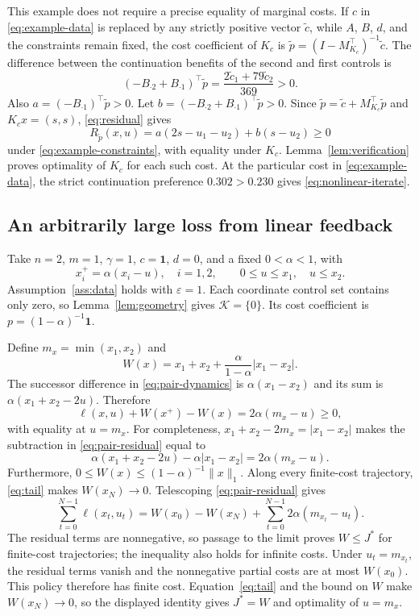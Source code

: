 \documentclass[10pt]{article}
\newcommand{\one}{\mathbf 1}
\begin{document}
This example does not require a precise equality of marginal costs. If $c$ in \eqref{eq:example-data} is replaced by any strictly positive vector $\widetilde c$, while $A$, $B$, $d$, and the constraints remain fixed, the cost coefficient of $K_c$ is $\widetilde p=(I-M_{K_c}^\top)^{-1}\widetilde c$. The difference between the continuation benefits of the second and first controls is
\[
 (-B_{\cdot2}+B_{\cdot1})^\top\widetilde p
 =\frac{2\widetilde c_1+79\widetilde c_2}{369}>0.
\]
Also $a=(-B_{\cdot1})^\top\widetilde p>0$. Let $b=(-B_{\cdot2}+B_{\cdot1})^\top\widetilde p>0$. Since $\widetilde p=\widetilde c+M_{K_c}^\top\widetilde p$ and $K_cx=(s,s)$, \eqref{eq:residual} gives
\[
 R_{\widetilde p}(x,u)=a(2s-u_1-u_2)+b(s-u_2)\ge0
\]
under \eqref{eq:example-constraints}, with equality under $K_c$. Lemma~\ref{lem:verification} proves optimality of $K_c$ for each such cost. At the particular cost in \eqref{eq:example-data}, the strict continuation preference $0.302>0.230$ gives \eqref{eq:nonlinear-iterate}.

\subsection{An arbitrarily large loss from linear feedback}

Take $n=2$, $m=1$, $\gamma=1$, $c=\one$, $d=0$, and a fixed $0<\alpha<1$, with
\begin{equation}
 x_i^+=\alpha(x_i-u),\quad i=1,2,\qquad
 0\le u\le x_1,\quad u\le x_2.
 \label{eq:pair-dynamics}
\end{equation}
Assumption~\ref{ass:data} holds with $\varepsilon=1$. Each coordinate control set contains only zero, so Lemma~\ref{lem:geometry} gives $\mathcal K=\{0\}$. Its cost coefficient is $p=(1-\alpha)^{-1}\one$.

Define $m_x=\min(x_1,x_2)$ and
\begin{equation}
 W(x)=x_1+x_2+\frac{\alpha}{1-\alpha}|x_1-x_2|.
 \label{eq:pair-value}
\end{equation}
The successor difference in \eqref{eq:pair-dynamics} is $\alpha(x_1-x_2)$ and its sum is $\alpha(x_1+x_2-2u)$. Therefore
\begin{equation}
 \ell(x,u)+W(x^+)-W(x)=2\alpha(m_x-u)\ge0,
 \label{eq:pair-residual}
\end{equation}
with equality at $u=m_x$. For completeness, $x_1+x_2-2m_x=|x_1-x_2|$ makes the subtraction in \eqref{eq:pair-residual} equal to
\[
 \alpha(x_1+x_2-2u)-\alpha|x_1-x_2|=2\alpha(m_x-u).
\]
Furthermore, $0\le W(x)\le(1-\alpha)^{-1}\|x\|_1$. Along every finite-cost trajectory, \eqref{eq:tail} makes $W(x_N)\to0$. Telescoping \eqref{eq:pair-residual} gives
\[
 \sum_{t=0}^{N-1}\ell(x_t,u_t)
 =W(x_0)-W(x_N)+\sum_{t=0}^{N-1}2\alpha(m_{x_t}-u_t).
\]
The residual terms are nonnegative, so passage to the limit proves $W\le J^*$ for finite-cost trajectories; the inequality also holds for infinite costs. Under $u_t=m_{x_t}$, the residual terms vanish and the nonnegative partial costs are at most $W(x_0)$. This policy therefore has finite cost. Equation~\eqref{eq:tail} and the bound on $W$ make $W(x_N)\to0$, so the displayed identity gives $J^*=W$ and optimality of $u=m_x$.
\end{document}
